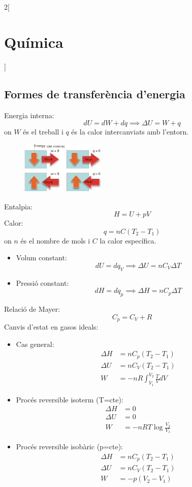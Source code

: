 \documentclass[class=article,10pt,crop=false]{standalone}
\begin{document}
\begin{multicols}{2}[\section{Química}]
\subsection{Formes de transferència d'energia}
Energia interna: 
$$dU=dW+dq\implies\Delta U=W+q$$ {\footnotesize on $W$ és el treball i $q$ és la calor intercanviats amb l'entorn.}\newline
\begin{figure}
    \centering
    \includegraphics[width=4cm]{Physics/1st/Quimica/Imatges/workheat.jpg}
    \label{fig:my_label}
\end{figure}
Entalpia: $$H=U+pV$$
Calor: $$q=nC(T_2-T_1)$$ {\footnotesize on $n$ és el nombre de mols i $C$ la calor específica.}
\begin{itemize}
    \item Volum constant: $$dU=dq_V\implies\Delta U=nC_V\Delta T$$
    \item Pressió constant: $$dH=dq_p\implies\Delta H=nC_p\Delta T$$
\end{itemize}
Relació de Mayer: $$C_p=C_V+R$$
Canvis d'estat en gasos ideals:
\begin{itemize}
    \item Cas general:
    \begin{align*}
        \Delta H&=nC_p(T_2-T_1)\\
        \Delta U&=nC_V(T_2-T_1)\\
        W&=-nR\int_{V_1}^{V_2}\frac{T}{V}dV
    \end{align*}
    \item Procés reversible isoterm (T=cte):
    \begin{align*}
        \Delta H&=0\\
        \Delta U&=0\\
        W&=-nRT\log\frac{V_2}{V_1}
    \end{align*}
    \item Procés reversible isobàric (p=cte):
    \begin{align*}
        \Delta H&=nC_p(T_2-T_1)\\
        \Delta U&=nC_V(T_2-T_1)\\
        W&=-p(V_2-V_1)

\end{align*}
\end{itemize}
\end{multicols}
\end{document}
